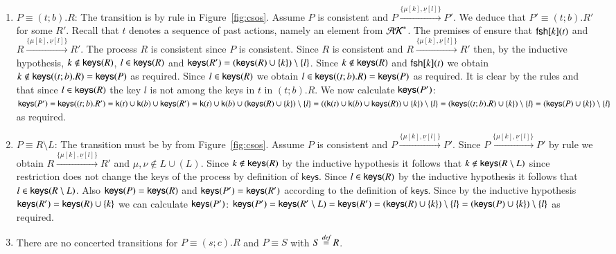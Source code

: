 \begin{subappendices}
\begin{pf}
\begin{enumerate}
\begin{enumerate}
\item $P \equiv (t; b).R$: The transition is by  rule in Figure~\ref{fig:csos}. 
Assume $P$ is consistent and $P \xrightarrow{\{\mu[k], \underline{\nu}[l]\}} P'$. 
We deduce that $P' \equiv(t;b).R'$ for some $R'$. Recall that $t$ denotes 
a sequence of past actions, namely an element from $\mathcal{AK}^*$. The premises of 
 ensure that $\mathsf{fsh}[k](t)$ and 
$R \xrightarrow{\{\mu[k],\underline{\nu}[l]\}} R'$. The process $R$ is consistent since 
$P$ is consistent. Since $R$ is consistent and $R \xrightarrow{\{\mu[k], 
\underline{\nu}[l]\}} R'$ then, by the inductive hypothesis, $k \notin \mathsf{keys}(R)$, 
$l \in \mathsf{keys}(R)$ and $\mathsf{keys}(R')=(\mathsf{keys}(R) \cup \{k\})\setminus\{l\}$. 
Since $k \notin \mathsf{keys}(R)$ and $\mathsf{fsh}[k](t)$ we obtain $k \notin \mathsf{keys}((t;b).R)=\mathsf{keys}(P)$ 
as required. Since $l \in \mathsf{keys}(R)$ we obtain $l \in \mathsf{keys}((t;b).R)=\mathsf{keys}(P)$ as required. 
It is clear by the rules  and  that since  $l \in \mathsf{keys}(R)$
the key $l$ is not among the keys in $t$ in $(t; b).R$.
We now calculate $\mathsf{keys}(P')$: $\mathsf{keys}(P')=\mathsf{keys}((t;b).R')=\mathsf{k}(t) \cup \mathsf{k}(b) \cup \mathsf{keys}(R')
= \mathsf{k}(t) \cup \mathsf{k}(b) \cup (\mathsf{keys}(R) \cup \{k\})\setminus\{l\}
= ((\mathsf{k}(t) \cup \mathsf{k}(b) \cup \mathsf{keys}(R)) \cup \{k\})\setminus\{l\}
=(\mathsf{keys}((t;b).R) \cup \{k\}) \setminus\{l\}=(\mathsf{keys}(P) \cup \{k\})\setminus\{l\}$ 
as required.

\item $P \equiv R \setminus L$: The transition must be by  from Figure~\ref{fig:csos}. Assume $P$ is consistent and $P \xrightarrow{\{\mu[k], \underline{\nu}[l]\}} P'$. Since $P \xrightarrow{\{\mu[k], \underline{\nu}[l]\}} P'$ by rule  we obtain $R \xrightarrow{\{\mu[k], \underline{\nu}[l]\}} R'$ and $\mu, \nu \notin L \cup (L)$. Since $k \notin \mathsf{keys}(R)$ by the inductive hypothesis it follows that $k \notin \mathsf{keys}(R \setminus L)$ since restriction does not change the keys of the process by definition of $\mathsf{keys}$. Since $l \in \mathsf{keys}(R)$ by the inductive hypothesis it follows that $l \in \mathsf{keys}(R \setminus L)$. Also $\mathsf{keys}(P)=\mathsf{keys}(R)$ and $\mathsf{keys}(P')=\mathsf{keys}(R')$ according to the definition of $\mathsf{keys}$. Since by the inductive hypothesis $\mathsf{keys}(R')=\mathsf{keys}(R) \cup \{k\}$ we can calculate $\mathsf{keys}(P')$: $\mathsf{keys}(P')=\mathsf{keys}(R' \setminus L)=\mathsf{keys}(R')=(\mathsf{keys}(R) \cup \{k\})\setminus\{l\}=(\mathsf{keys}(P) \cup \{k\})\setminus\{l\}$ as required.

\item There are no concerted transitions for $P \equiv (s; c).R$ and $P \equiv S$ with $S\stackrel{\emph{def}}{=} R$.
\end{enumerate}
\end{enumerate}
\end{pf}


\end{subappendices}
